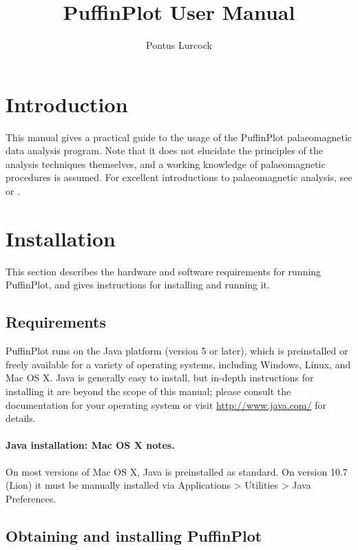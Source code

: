 \documentclass[a4paper,british]{article}
\title{PuffinPlot User Manual}
\author{Pontus Lurcock}
\date{\HgDate}
\newcommand{\ppcmd}[1]{\textsf{#1}} %
\newcommand{\submenu}{ \textgreater{} } %
\begin{document}
\maketitle

\section{Introduction}

This manual gives a practical guide to the usage of the PuffinPlot
palaeomagnetic data analysis program. Note that it does not elucidate the
principles of the analysis techniques themselves, and a working knowledge of
palaeomagnetic procedures is assumed. For excellent introductions to
palaeomagnetic analysis, see \cite{tauxe2010paleomagnetism} or
\cite{butler1992paleomagnetism}.

\section{Installation}

This section describes the hardware and software requirements for
running PuffinPlot, and gives instructions for installing and running
it.

\subsection{Requirements}

PuffinPlot runs on the Java platform (version 5 or later), which is
preinstalled or freely available for a variety of operating systems,
including Windows, Linux, and Mac OS X. Java is generally easy to install,
but in-depth instructions for installing it are beyond the scope of this
manual; please consult the documentation for your operating system or visit
\url{http://www.java.com/} for details.

\paragraph{Java installation: Mac OS X notes.} On most versions of Mac OS X,
Java is preinstalled as standard. On version 10.7 (Lion) it must be manually
installed via \ppcmd{Applications\submenu Utilities\submenu Java
  Preferences}.

\subsection{Obtaining and installing PuffinPlot}
\end{document}
